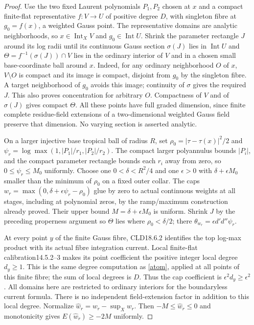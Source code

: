 \documentclass[11pt]{article}
\newcommand{\DD}{d'd''}
\begin{document}
\begin{proof}
Use the two fixed Laurent polynomials $P_1,P_2$ chosen at $x$ and a
compact finite-flat representative $f:V\to U$ of positive degree $D$,
with singleton fibre at $g_0=f(x)$, a weighted Gauss point. The
representative domains are analytic neighborhoods, so $x\in\operatorname{Int}_X V$
and $g_0\in\operatorname{Int}U$. Shrink the parameter rectangle $J$
around its log radii until its continuous Gauss section $\sigma(J)$
lies in $\operatorname{Int}U$ and
$\Theta=f^{-1}(\sigma(J))\cap V$ lies in the ordinary interior of
$V$ and in a chosen small base-coordinate ball around $x$.
Indeed, for any ordinary neighborhood $O$ of $x$, $V\setminus O$
is compact and its image is compact, disjoint from $g_0$ by the singleton
fibre. A target neighborhood of $g_0$ avoids this image; continuity of
$\sigma$ gives the required $J$. This also proves concentration for
arbitrary $O$. Compactness of $V$ and of $\sigma(J)$ gives compact
$\Theta$. All these points have full graded dimension, since finite
complete residue-field extensions of a two-dimensional weighted Gauss
field preserve that dimension. No varying section is asserted analytic.

On a larger injective base tropical ball of radius $R$, set
$\rho_0=|\tau-\tau(x)|^2/2$ and
$\psi_r=\log\max(1,|P_1|/r_1,|P_2|/r_2)$.
The compact larger polyannulus bounds $|P_i|$, and the compact parameter
rectangle bounds each $r_i$ away from zero, so $0\le\psi_r\le M_0$
uniformly. Choose one $0<\delta<R^2/4$ and one $\epsilon>0$ with
$\delta+\epsilon M_0$ smaller than the minimum of $\rho_0$ on a
fixed outer collar. The caps
$w_r=\max(0,\delta+\epsilon\psi_r-\rho_0)$ glue by zero to
actual continuous weights at all stages, including at polynomial zeros,
by the ramp/maximum construction already proved. Their upper bound
$M=\delta+\epsilon M_0$ is uniform. Shrink $J$ by the preceding
properness argument so $\Theta$ lies where $\rho_0<\delta/2$;
there $\theta_{w_r}=\epsilon\DD\psi_r$.

At every point $y$ of the finite Gauss fibre, CLD18.6.2 identifies the
top log-max product with its actual fibre integration current. Local
finite-flat calibration14.5.2--3 makes its point coefficient the positive
integer local degree $d_y\ge1$. This is the same degree computation as
\eqref{atom}, applied at all points of this finite fibre; the sum of
local degrees is $D$. Thus the cap coefficient is
$\epsilon^2d_y\ge\epsilon^2$. All domains here are restricted to
ordinary interiors for the boundaryless current formula. There is no
independent field-extension factor in addition to this local degree.
Normalize $\widehat w_r=w_r-\sup_Xw_r$.
Then $-M\le\widehat w_r\le0$ and monotonicity gives
$E(\widehat w_r)\ge-2M$ uniformly.


\end{proof}
\end{document}
